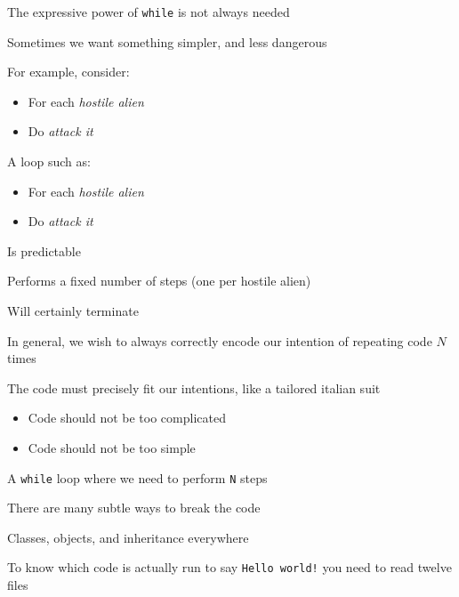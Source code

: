 \documentclass{beamer}
\begin{document}

\begin{slide}{
\item The expressive power of \texttt{while} is not always needed
\item Sometimes we want something simpler, and less dangerous
\item For example, consider:
\begin{itemize}
\item For each \textit{hostile alien}
\item Do \textit{attack it}
\end{itemize}
}\end{slide}

\begin{slide}{
\item A loop such as:
\begin{itemize}
\item For each \textit{hostile alien}
\item Do \textit{attack it}
\end{itemize}
\item Is predictable
\item Performs a fixed number of steps (one per hostile alien)
\item Will certainly terminate
}\end{slide}

\begin{slide}{
\item In general, we wish to always correctly encode our intention of repeating code $N$ times
\item The code must precisely fit our intentions, like a tailored italian suit
\begin{itemize}
\item Code should not be too complicated
\item Code should not be too simple
\end{itemize}
}\end{slide}

\begin{slide}{
\item A \texttt{while} loop where we need to perform \texttt{N} steps
\item There are many subtle ways to break the code
}\end{slide}

\begin{slide}{
\item Classes, objects, and inheritance everywhere
\item To know which code is actually run to say \texttt{Hello world!} you need to read twelve files
}\end{slide}
\end{document}
